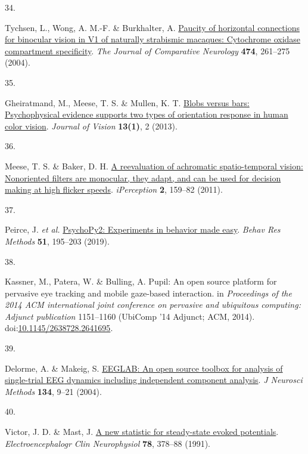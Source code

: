 \documentclass[
]{article}
\newlength{\cslhangindent}
\newlength{\csllabelwidth}
\newlength{\cslentryspacingunit} %
\newenvironment{CSLReferences}[2] %
 {%
  \setlength{\parindent}{0pt}
  \ifodd #1
  \let\oldpar\par
  \def\par{\hangindent=\cslhangindent\oldpar}
  \fi
  \setlength{\parskip}{#2\cslentryspacingunit}
 }%
 {}
\newcommand{\CSLLeftMargin}[1]{\parbox[t]{\csllabelwidth}{#1}}
\newcommand{\CSLRightInline}[1]{\parbox[t]{\linewidth - \csllabelwidth}{#1}\break}
\begin{document}
\begin{CSLReferences}{0}{0}
\leavevmode{}%
\CSLLeftMargin{34. }%
\CSLRightInline{Tychsen, L., Wong, A. M.-F. \& Burkhalter, A. \href{https://doi.org/10.1002/cne.20113}{Paucity of horizontal connections for binocular vision in V1 of naturally strabismic macaques: Cytochrome oxidase compartment specificity}. \emph{The Journal of Comparative Neurology} \textbf{474}, 261--275 (2004).}

\leavevmode{}%
\CSLLeftMargin{35. }%
\CSLRightInline{Gheiratmand, M., Meese, T. S. \& Mullen, K. T. \href{https://doi.org/10.1167/13.1.2}{Blobs versus bars: Psychophysical evidence supports two types of orientation response in human color vision}. \emph{Journal of Vision} \textbf{13(1)}, 2 (2013).}

\leavevmode{}%
\CSLLeftMargin{36. }%
\CSLRightInline{Meese, T. S. \& Baker, D. H. \href{https://doi.org/10.1068/i0416}{A reevaluation of achromatic spatio-temporal vision: Nonoriented filters are monocular, they adapt, and can be used for decision making at high flicker speeds}. \emph{{iPerception}} \textbf{2}, 159--82 (2011).}

\leavevmode{}%
\CSLLeftMargin{37. }%
\CSLRightInline{Peirce, J. \emph{et al.} \href{https://doi.org/10.3758/s13428-018-01193-y}{PsychoPy2: Experiments in behavior made easy}. \emph{Behav Res Methods} \textbf{51}, 195--203 (2019).}

\leavevmode{}%
\CSLLeftMargin{38. }%
\CSLRightInline{Kassner, M., Patera, W. \& Bulling, A. Pupil: An open source platform for pervasive eye tracking and mobile gaze-based interaction. in \emph{Proceedings of the 2014 {ACM} international joint conference on pervasive and ubiquitous computing: Adjunct publication} 1151--1160 (UbiComp '14 Adjunct; {ACM}, 2014). doi:\href{https://doi.org/10.1145/2638728.2641695}{10.1145/2638728.2641695}.}

\leavevmode{}%
\CSLLeftMargin{39. }%
\CSLRightInline{Delorme, A. \& Makeig, S. \href{https://doi.org/10.1016/j.jneumeth.2003.10.009}{{EEGLAB}: An open source toolbox for analysis of single-trial {EEG} dynamics including independent component analysis}. \emph{J Neurosci Methods} \textbf{134}, 9--21 (2004).}

\leavevmode{}%
\CSLLeftMargin{40. }%
\CSLRightInline{Victor, J. D. \& Mast, J. \href{https://doi.org/10.1016/0013-4694(91)90099-p}{A new statistic for steady-state evoked potentials}. \emph{Electroencephalogr Clin Neurophysiol} \textbf{78}, 378--88 (1991).}


\end{CSLReferences}
\end{document}

